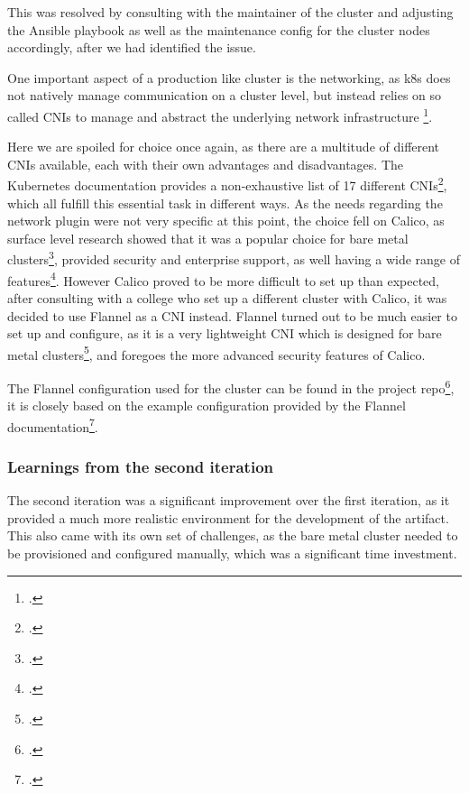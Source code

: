 This was resolved by consulting with the maintainer of the cluster and adjusting the Ansible playbook as well as the maintenance config for the cluster nodes accordingly, 
after we had identified the issue.


One important aspect of a production like cluster is the networking, as \ac{k8s} does not natively manage communication on a cluster level,
but instead relies on so called \ac{CNI}s to manage and abstract the underlying network infrastructure \footcite{ClusterNetworking}.

Here we are spoiled for choice once again, as there are a multitude of different \ac{CNI}s available, each with their own advantages and disadvantages.
The Kubernetes documentation provides a non-exhaustive list of 17 different \ac{CNI}s\footcite{KubernetesCNIPlugins}, which all fulfill this essential task in different ways.
As the needs regarding the network plugin were not very specific at this point, the choice fell on Calico, as surface level research showed that it was a popular choice for bare metal clusters\footcite{ExploreNetworkPlugins},
provided security and enterprise support, as well having a wide range of features\footcite{mehndirattaComparingKubernetesContainer}.
However Calico proved to be more difficult to set up than expected, after consulting with a college who set up a different cluster with Calico,
it was decided to use Flannel as a \ac{CNI} instead.
Flannel turned out to be much easier to set up and configure, as it is a very lightweight \ac{CNI} which is designed for bare metal clusters\footcite{Flannel2023}, 
and foregoes the more advanced security features of Calico. 

The Flannel configuration used for the cluster can be found in the project repo\footcite{Flannel_config}, it is closely based on the example configuration provided by the Flannel documentation\footcite{FlannelInstallConfig}.

\subsubsection*{Learnings from the second iteration}

The second iteration was a significant improvement over the first iteration, as it provided a much more realistic environment for the development of the artifact.
This also came with its own set of challenges, as the bare metal cluster needed to be provisioned and configured manually, which was a significant time investment.

